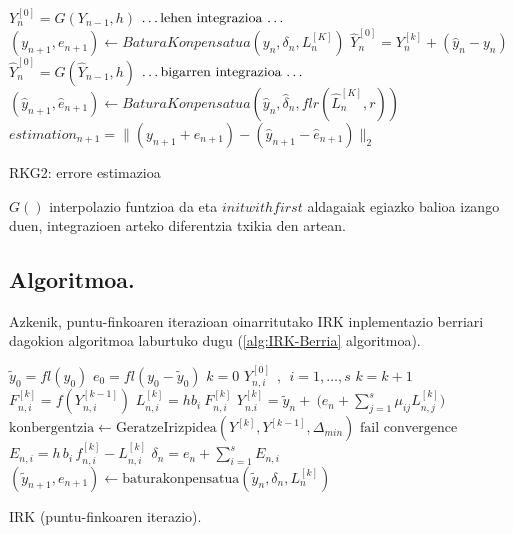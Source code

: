 \begin{algorithm}[h]
  \BlankLine
  {
    \BlankLine
    $Y_n^{[0]}=G(Y_{n-1},h)$\;
    \BlankLine
    $\text{\dots lehen integrazioa \dots}$\;
	\BlankLine
    $(y_{n+1},e_{n+1})\leftarrow BaturaKonpensatua(y_n,\delta_n,L_n^{[K]})$\;      
    \BlankLine
    \BlankLine
    {$\hat{Y}_{n}^{[0]}=Y_{n}^{[k]}+(\hat{y}_n-y_n)$\;}
    {$\hat{Y}_{n}^{[0]}=G(\hat{Y}_{n-1},h)$\;}
    \BlankLine
    $\text{\dots bigarren integrazioa \dots}$\;
	\BlankLine
    $(\hat{y}_{n+1},\hat{e}_{n+1})\leftarrow BaturaKonpensatua(\hat{y}_n,\hat{\delta}_n,flr(\hat{L}_n^{[K]},r))$\;  
    \BlankLine
    \BlankLine
    $estimation_{n+1}=\|(y_{n+1}+e_{n+1})-(\hat{y}_{n+1}-\hat{e}_{n+1})\|_2$\;
    \BlankLine
   }
 \caption{RKG2: errore estimazioa}
 \label{alg:errore-estimazioa}
\end{algorithm}

$G()$ interpolazio funtzioa da eta $initwithfirst$ aldagaiak egiazko balioa izango duen, integrazioen arteko diferentzia txikia den artean.

\subsection{Algoritmoa.}

Azkenik, puntu-finkoaren iterazioan oinarritutako IRK inplementazio berriari dagokion algoritmoa laburtuko dugu (\ref{alg:IRK-Berria} algoritmoa).

\begin{algorithm}[H]
 \BlankLine
  $\tilde{y}_0=fl(y_0)$\;
  $e_0=fl(y_0-\tilde{y}_0)$\;
  {
   \BlankLine
   $k=0$\;
     $Y_{n,i}^{[0]} \ \ , \ \ i=1,\dots,s $\;
   \BlankLine
   {
    \BlankLine 
    $k=k+1$\;
    $F_{n,i}^{[k]}=f(Y_{n,i}^{[k-1]}) $\;
    $L_{n,i}^{[k]}=hb_i \ F_{n,i}^{[k]} $\;
    $Y_{n.i}^{[k]}=\tilde{y}_{n} + \ \big(e_n+\sum\limits_{j=1}^{s} \mu_{ij} L_{n,j}^{[k]}\big)  $\;  
    $\text{konbergentzia} \leftarrow \text{GeratzeIrizpidea}(Y^{[k]},Y^{[k-1]},\Delta_{min}) $\;
   }
   \BlankLine
   {
   {$\text{fail convergence}$\;}
   }
   $E_{n,i} = h\,   b_i\,f_{n,i}^{[k]}-L_{n,i}^{[k]}$\;
   $\delta_{n}=e_{n}+\sum_{i=1}^{s} E_{n,i}$\;
   $(\tilde y_{n+1}, e_{n+1})\leftarrow \text{baturakonpensatua}(\tilde y_{n},\delta_{n},L_{n}^{[k]})$\;
   \BlankLine
 }
 \caption{IRK (puntu-finkoaren iterazio).}
 \label{alg:IRK-Berria}
\end{algorithm}

